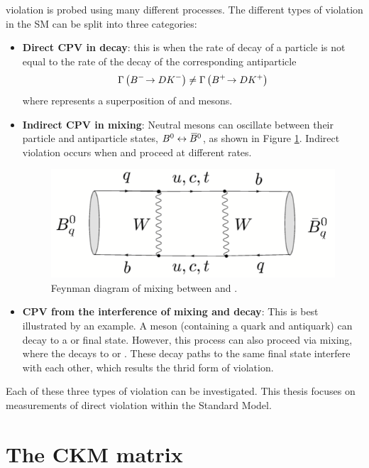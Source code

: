 \CP violation is probed using many different processes. The different types of \CP violation in the SM can be split into three categories:
\begin{itemize}
\item \textbf{Direct CPV in decay}: this is when the rate of decay of a particle is not equal to the rate of the decay of the corresponding antiparticle \eg
\begin{equation*}
\Gamma\left({{{B}^-}}\!\rightarrow {\ensuremath{D}}{\ensuremath{{K}^-}}\right) \neq \Gamma\left({{{B}^+}}\!\rightarrow {\ensuremath{D}}{\ensuremath{{K}^+}}\right)
\end{equation*}
where \D represents a  superposition of \Dz and \Dzb mesons.
\item \textbf{Indirect CPV in mixing}: Neutral mesons can oscillate between their particle and antiparticle states, ${{B}^0} \leftrightarrow {\ensuremath{{\kern 0.18em\overline{\kern -0.18em B}{}}{}^0}}$, as shown in Figure \ref{mixing}. Indirect \CP violation occurs when \decay{\Bz}{\Bzb} and \decay{\Bzb}{\Bz} proceed at different rates. 
\begin{figure}[h]
\centering
\includegraphics[width=0.5\linewidth]{figures/theory/mixing.pdf}
\caption{Feynman diagram of mixing between \Bz and \Bzb.}
\label{mixing}
\end{figure}
\item \textbf{CPV from the interference of mixing and decay}: This is best illustrated by an example. A \Bs meson (containing a \bquark quark and \squark antiquark) can decay to a \Dsm\Kp or \Dsp\Km final state. However, this process can also proceed via \decay{\Bs}{\Bsb} mixing, where the \Bsb decays to \Dsm\Kp or \Dsp\Km. These decay paths to the same final state interfere with each other, which results the thrid form of \CP violation.
\end{itemize} 

Each of these three types of \CP violation can be investigated. This thesis focuses on measurements of direct \CP violation within the Standard Model.

\section{The CKM matrix}

